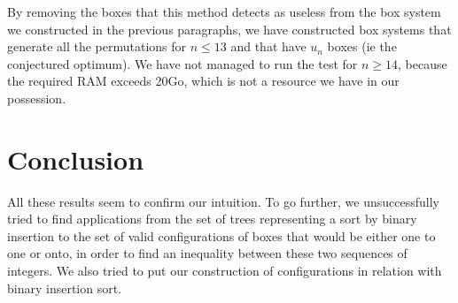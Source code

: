 \documentclass[11pt, a4paper]{article}
\begin{document}
By removing the boxes that this method detects as useless from the box system we
constructed in the previous paragraphs, we have constructed box systems that
generate all the permutations for $n \leq 13$ and that have $u_n$ boxes (ie the
conjectured optimum). We have not managed to run the test for $n \geq 14$,
because the required RAM exceeds 20Go, which is not a resource we have in our
possession.

\section{Conclusion}

All these results seem to confirm our intuition.
To go further, we unsuccessfully tried to find applications from the set of trees representing a sort by binary insertion to the set of valid configurations of boxes 
that would be either one to one or onto, in order to find an inequality between these two sequences of integers.
We also tried to put our construction of configurations in relation with binary insertion sort. 
\end{document}

